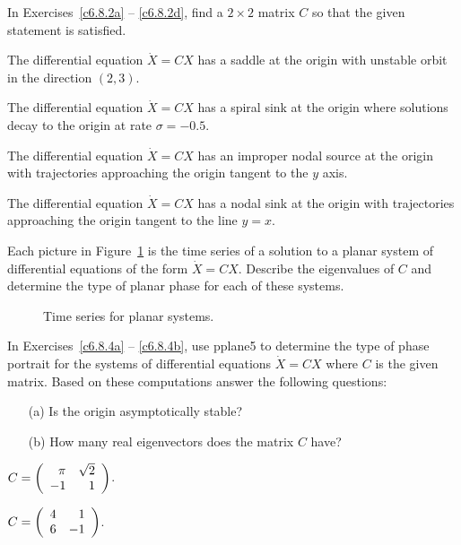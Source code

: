 \documentclass{ximera}
\begin{document}
\noindent In Exercises~\ref{c6.8.2a} -- \ref{c6.8.2d}, find a $2\times 2$
matrix $C$ so that the given statement is satisfied.
\begin{exercise} \label{c6.8.2a}
The differential equation $\dot{X}=CX$ has a saddle at the origin with
unstable orbit in the direction $(2,3)$.
\end{exercise}
\begin{exercise} \label{c6.8.2b}
The differential equation $\dot{X}=CX$ has a spiral sink at the origin
where solutions decay to the origin at rate $\sigma=-0.5$.
\end{exercise}
\begin{exercise} \label{c6.8.2c}
The differential equation $\dot{X}=CX$ has an improper nodal source at the
origin with trajectories approaching the origin tangent to the $y$ axis.
\end{exercise}
\begin{exercise} \label{c6.8.2d}
The differential equation $\dot{X}=CX$ has a nodal sink at the origin with
trajectories approaching the origin tangent to the line $y=x$.
\end{exercise}

\begin{exercise} \label{c6.8.3}
Each picture in Figure~\ref{F:E:timeseries} is the time series of a
solution to a planar system of differential equations of the form
$\dot{X}=CX$.  Describe the eigenvalues of $C$ and determine the type
of planar phase for each of these systems.
\end{exercise}
\begin{figure}[htb]
        \centerline{%
        }
	\caption{Time series for planar systems.}
	\label{F:E:timeseries}
\end{figure}


\CEXER

\noindent In Exercises~\ref{c6.8.4a} -- \ref{c6.8.4b}, use {\sf pplane5} to
determine the type of phase portrait for the systems of differential equations
$\dot{X}=CX$ where $C$ is the given matrix.  Based on these computations
answer the following questions:
\begin{itemize}
\item[(a)]  Is the origin asymptotically stable?
\item[(b)]  How many real eigenvectors does the matrix $C$ have?
\end{itemize}
\begin{exercise} \label{c6.8.4a}
$C=\left(\begin{array}{rr} \pi & \sqrt{2}\\ -1 &1\end{array}\right)$.
\end{exercise}
\begin{exercise} \label{c6.8.4b}
$C=\left(\begin{array}{rr} 4 & 1\\ 6 &-1\end{array}\right)$.
\end{exercise}
\end{document}

